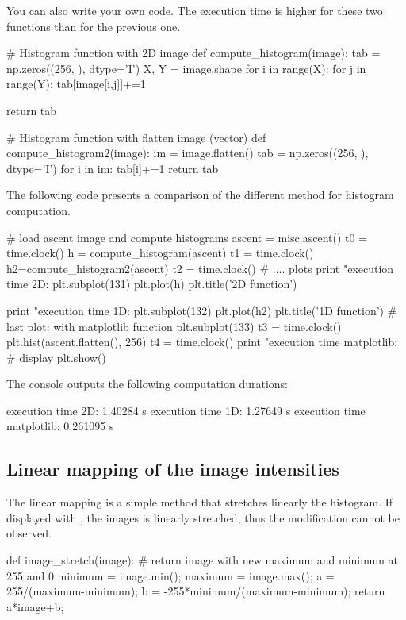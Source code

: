 You can also write your own code. The execution time is higher for these two functions than for the previous one.
\begin{python}
# Histogram function with 2D image
def compute_histogram(image):
    tab = np.zeros((256, ), dtype='I')
    X, Y = image.shape
    for i in range(X):
        for j in range(Y):
            tab[image[i,j]]+=1

    return tab
\end{python}
    
\begin{python}
# Histogram function with flatten image (vector)
def compute_histogram2(image):
    im = image.flatten() 
    tab = np.zeros((256, ), dtype='I')
    for i in im:
        tab[i]+=1
    return tab
\end{python}

The following code presents a comparison of the different method for histogram computation.

\begin{python}
# load ascent image and compute histograms
ascent = misc.ascent()
t0 = time.clock()
h = compute_histogram(ascent)
t1 = time.clock()
h2=compute_histogram2(ascent)
t2 = time.clock()
# .... plots
print "execution time 2D:%
plt.subplot(131)
plt.plot(h)
plt.title('2D function')

print "execution time 1D:%
plt.subplot(132)
plt.plot(h2)
plt.title('1D function')
# last plot: with matplotlib function
plt.subplot(133)
t3 = time.clock()
plt.hist(ascent.flatten(), 256)
t4 = time.clock()
print "execution time matplotlib:%
# display
plt.show()
\end{python}
The console outputs the following computation durations:
\begin{sh}
execution time 2D: 1.40284 s
execution time 1D: 1.27649 s
execution time matplotlib: 0.261095 s
\end{sh}


\subsection{Linear mapping of the image intensities}
The linear mapping is a simple method that stretches linearly the histogram. If displayed with , the images is linearly stretched, thus the modification cannot be observed.

\begin{python}
def image_stretch(image):
	# return image with new maximum and minimum at 255 and 0
	minimum = image.min();
	maximum = image.max();
	a = 255/(maximum-minimum);
	b = -255*minimum/(maximum-minimum);
	return a*image+b;
\end{python}


